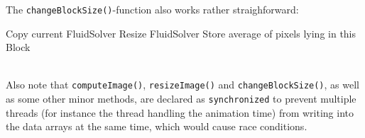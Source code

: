 \documentclass[a4paper,10pt,oneside,final,german,openbib,pdftex,titlepage]{scrbook}
\begin{document}
The \texttt{changeBlockSize()}-function also works rather straighforward:\medskip\\
%
\begin{function}[H]
\DontPrintSemicolon
{}
\Fn{\cBB{}}
{
	Copy current FluidSolver\;
	Resize FluidSolver\;
	{
		Store average of pixels lying in this Block\;
	}
	\nA{}\;
}
\end{function}
\hfill\medskip\\
%
Also note that \texttt{computeImage()}, \texttt{resizeImage()} and \texttt{changeBlockSize()}, as well as some other minor methods, are declared as \texttt{synchronized} to prevent multiple threads (for instance the thread handling the animation time) from writing into the data arrays at the same time, which would cause race conditions.
%
%
%
\end{document}
